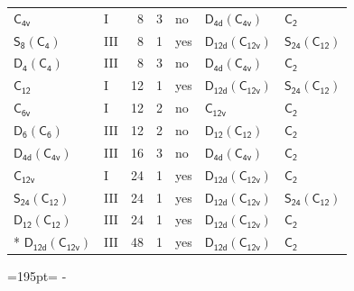 \documentclass[10pt,a4paper]{article}
\newcommand{\needspace}[1]{\par\penalty-100\begingroup\dimen0=#1\relax\dimen2=\pagegoal
  \advance\dimen2-\pagetotal\ifdim\dimen0>\dimen2\relax\ifdim\dimen2>0pt\vfil\break\fi\fi
  \endgroup}
\numberwithin{equation}{section}
\newcommand{\grp}[1]{\mathsf{#1}}
\begin{document}
{\begin{longtable}{@{}llrrlll@{}}
\href{../../../rotation/data/pdf/C4v.pdf}{$\grp{C_{4v}}$} & I & 8 & 3 & no & \href{D4d-C4v.pdf}{$\grp{D_{4d}}(\grp{C_{4v}})$} & \href{../../../rotation/data/pdf/C2.pdf}{$\grp{C_{2}}$}\\
\href{S8-C4.pdf}{$\grp{S_{8}}(\grp{C_{4}})$} & III & 8 & 1 & yes & \href{D12d-C12v.pdf}{$\grp{D_{12d}}(\grp{C_{12v}})$} & \href{S24-C12.pdf}{$\grp{S_{24}}(\grp{C_{12}})$}\\
\href{D4-C4.pdf}{$\grp{D_{4}}(\grp{C_{4}})$} & III & 8 & 3 & no & \href{D4d-C4v.pdf}{$\grp{D_{4d}}(\grp{C_{4v}})$} & \href{../../../rotation/data/pdf/C2.pdf}{$\grp{C_{2}}$}\\
\href{../../../rotation/data/pdf/C12.pdf}{$\grp{C_{12}}$} & I & 12 & 1 & yes & \href{D12d-C12v.pdf}{$\grp{D_{12d}}(\grp{C_{12v}})$} & \href{S24-C12.pdf}{$\grp{S_{24}}(\grp{C_{12}})$}\\
\href{../../../rotation/data/pdf/C6v.pdf}{$\grp{C_{6v}}$} & I & 12 & 2 & no & \href{../../../rotation/data/pdf/C12v.pdf}{$\grp{C_{12v}}$} & \href{../../../rotation/data/pdf/C2.pdf}{$\grp{C_{2}}$}\\
\href{D6-C6.pdf}{$\grp{D_{6}}(\grp{C_{6}})$} & III & 12 & 2 & no & \href{D12-C12.pdf}{$\grp{D_{12}}(\grp{C_{12}})$} & \href{../../../rotation/data/pdf/C2.pdf}{$\grp{C_{2}}$}\\
\href{D4d-C4v.pdf}{$\grp{D_{4d}}(\grp{C_{4v}})$} & III & 16 & 3 & no & \href{D4d-C4v.pdf}{$\grp{D_{4d}}(\grp{C_{4v}})$} & \href{../../../rotation/data/pdf/C2.pdf}{$\grp{C_{2}}$}\\
\href{../../../rotation/data/pdf/C12v.pdf}{$\grp{C_{12v}}$} & I & 24 & 1 & yes & \href{D12d-C12v.pdf}{$\grp{D_{12d}}(\grp{C_{12v}})$} & \href{../../../rotation/data/pdf/C2.pdf}{$\grp{C_{2}}$}\\
\href{S24-C12.pdf}{$\grp{S_{24}}(\grp{C_{12}})$} & III & 24 & 1 & yes & \href{D12d-C12v.pdf}{$\grp{D_{12d}}(\grp{C_{12v}})$} & \href{S24-C12.pdf}{$\grp{S_{24}}(\grp{C_{12}})$}\\
\href{D12-C12.pdf}{$\grp{D_{12}}(\grp{C_{12}})$} & III & 24 & 1 & yes & \href{D12d-C12v.pdf}{$\grp{D_{12d}}(\grp{C_{12v}})$} & \href{../../../rotation/data/pdf/C2.pdf}{$\grp{C_{2}}$}\\*
\href{D12d-C12v.pdf}{$\grp{D_{12d}}(\grp{C_{12v}})$} & III & 48 & 1 & yes & \href{D12d-C12v.pdf}{$\grp{D_{12d}}(\grp{C_{12v}})$} & \href{../../../rotation/data/pdf/C2.pdf}{$\grp{C_{2}}$}\\
\bottomrule\end{longtable}}
\needspace{195pt}
\end{document}
